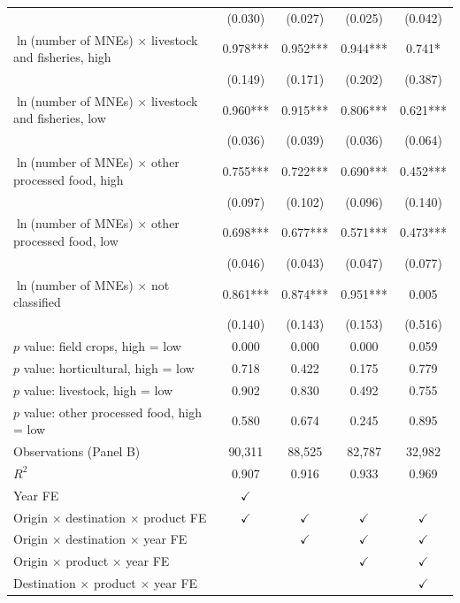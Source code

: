 \begin{tabular}{l*{4}{c}}
 & (0.030) & (0.027) & (0.025) & (0.042) \\
$\ln$(number of MNEs) $\times$ livestock and fisheries, high & 0.978*** & 0.952*** & 0.944*** & 0.741* \\
 & (0.149) & (0.171) & (0.202) & (0.387) \\
$\ln$(number of MNEs) $\times$ livestock and fisheries, low & 0.960*** & 0.915*** & 0.806*** & 0.621*** \\
 & (0.036) & (0.039) & (0.036) & (0.064) \\
$\ln$(number of MNEs) $\times$ other processed food, high & 0.755*** & 0.722*** & 0.690*** & 0.452*** \\
 & (0.097) & (0.102) & (0.096) & (0.140) \\
$\ln$(number of MNEs) $\times$ other processed food, low & 0.698*** & 0.677*** & 0.571*** & 0.473*** \\
 & (0.046) & (0.043) & (0.047) & (0.077) \\
$\ln$(number of MNEs) $\times$ not classified & 0.861*** & 0.874*** & 0.951*** & 0.005 \\
 & (0.140) & (0.143) & (0.153) & (0.516) \\
$p$ value: field crops, high = low & 0.000 & 0.000 & 0.000 & 0.059 \\
$p$ value: horticultural, high = low & 0.718 & 0.422 & 0.175 & 0.779 \\
$p$ value: livestock, high = low & 0.902 & 0.830 & 0.492 & 0.755 \\
$p$ value: other processed food, high = low & 0.580 & 0.674 & 0.245 & 0.895 \\
Observations (Panel B) & 90,311 & 88,525 & 82,787 & 32,982 \\
$R^2$ & 0.907 & 0.916 & 0.933 & 0.969 \\
\midrule
Year FE & $\checkmark$ &  &  &  \\
Origin $\times$ destination $\times$ product FE & $\checkmark$ & $\checkmark$ & $\checkmark$ & $\checkmark$ \\
Origin $\times$ destination $\times$ year FE &  & $\checkmark$ & $\checkmark$ & $\checkmark$ \\
Origin $\times$ product $\times$ year FE &  &  & $\checkmark$ & $\checkmark$ \\
Destination $\times$ product $\times$ year FE &  &  &  & $\checkmark$ \\
\bottomrule
\end{tabular}
